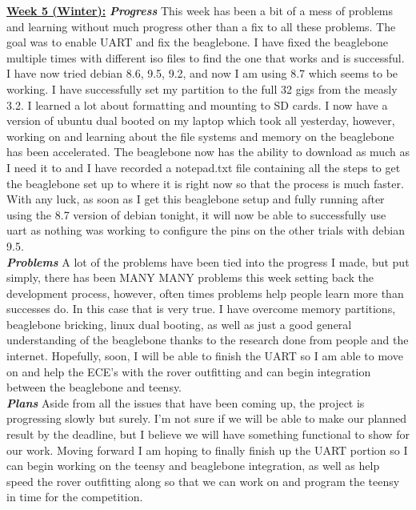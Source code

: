 \documentclass[onecolumn, draftclsnofoot, 10pt, compsoc]{IEEEtran}
\begin{document}
\underline{\textbf{Week 5 (Winter):}}
\newline\textbf{\textit{{Progress}}}
\newline This week has been a bit of a mess of problems and learning without much progress other than a fix to all these problems. The goal was to enable UART and fix the beaglebone. I have fixed the beaglebone multiple times with different iso files to find the one that works and is successful. I have now tried debian 8.6, 9.5, 9.2, and now I am using 8.7 which seems to be working. I have successfully set my partition to the full 32 gigs from the measly 3.2. I learned a lot about formatting and mounting to SD cards. I now have a version of ubuntu dual booted on my laptop which took all yesterday, however, working on and learning about the file systems and memory on the beaglebone has been accelerated. The beaglebone now has the ability to download as much as I need it to and I have recorded a notepad.txt file containing all the steps to get the beaglebone set up to where it is right now so that the process is much faster. With any luck, as soon as I get this beaglebone setup and fully running after using the 8.7 version of debian tonight, it will now be able to successfully use uart as nothing was working to configure the pins on the other trials with debian 9.5. \\
\newline\textbf{\textit{{Problems}}}
\newline A lot of the problems have been tied into the progress I made, but put simply, there has been MANY MANY problems this week setting back the development process, however, often times problems help people learn more than successes do. In this case that is very true. I have overcome memory partitions, beaglebone bricking, linux dual booting, as well as just a good general understanding of the beaglebone thanks to the research done from people and the internet. Hopefully, soon, I will be able to finish the UART so I am able to move on and help the ECE's with the rover outfitting and can begin integration between the beaglebone and teensy.\\
\newline\textbf{\textit{{Plans}}}
\newline Aside from all the issues that have been coming up, the project is progressing slowly but surely. I'm not sure if we will be able to make our planned result by the deadline, but I believe we will have something functional to show for our work. Moving forward I am hoping to finally finish up the UART portion so I can begin working on the teensy and beaglebone integration, as well as help speed the rover outfitting along so that we can work on and program the teensy in time for the competition. \newline 
\end{document}
